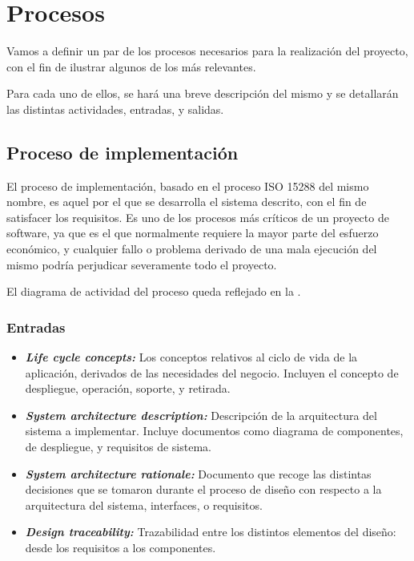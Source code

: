 \section{Procesos}
Vamos a definir un par de los procesos necesarios para la realización del proyecto, con el fin de ilustrar algunos de los más relevantes.

Para cada uno de ellos, se hará una breve descripción del mismo y se detallarán las distintas actividades, entradas, y salidas.


\subsection{Proceso de implementación}  %
El proceso de implementación, basado en el proceso ISO 15288 del mismo nombre, es aquel por el que se desarrolla el sistema descrito, con el fin de satisfacer los requisitos. Es uno de los procesos más críticos de un proyecto de software, ya que es el que normalmente requiere la mayor parte del esfuerzo económico, y cualquier fallo o problema derivado de una mala ejecución del mismo podría perjudicar severamente todo el proyecto.

El diagrama de actividad del proceso queda reflejado en la .



\subsubsection{Entradas}
\begin{itemize}
  \item \textbf{\textit{Life cycle concepts:}} Los conceptos relativos al ciclo de vida de la aplicación, derivados de las necesidades del negocio. Incluyen el concepto de despliegue, operación, soporte, y retirada.
  \item \textbf{\textit{System architecture description:}} Descripción de la arquitectura del sistema a implementar. Incluye documentos como diagrama de componentes, de despliegue, y requisitos de sistema.
  \item \textbf{\textit{System architecture rationale:}} Documento que recoge las distintas decisiones que se tomaron durante el proceso de diseño con respecto a la arquitectura del sistema, interfaces, o requisitos.
  \item \textbf{\textit{Design traceability:}} Trazabilidad entre los distintos elementos del diseño: desde los requisitos a los componentes.
\end{itemize}


